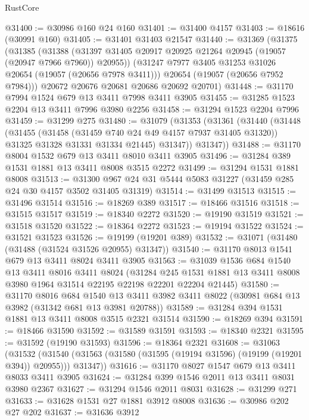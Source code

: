 \begin{lexlean}{RustCore}
\begin{coremodule}
@31400 := @30986 @160 @24 @160
@31401 := @31400 @4157
@31403 := @18616 (@30991 @160)
@31405 := @31401 @31403 @21547
@31440 := @31369
    (@31375
      (@31385
        (@31388 (@31397 @31405 @20917 @20925 @21264 @20945 (@19057 (@20947 @7966 @7960)) @20955))
        (@31247 @7977 @3405 @31253 @31026 @20654 (@19057 (@20656 @7978 @3411)))
        @20654
        (@19057 (@20656 @7952 @7984)))
      @20672
      @20676
      @20681
      @20686
      @20692
      @20701)
@31448 := @31170 @7994 @1524 @679 @13 @3411 @7998 @3411 @3905
@31455 := @31285 @1523 @2204 @13 @3411 @7996 @3980 @2256
@31458 := @31294 @1523 @2204 @7996
@31459 := @31299 @275
@31480 := @31079
    (@31353
      (@31361
        (@31440
          (@31448
            (@31455
              (@31458 (@31459 @740 @24 @49 @4157 @7937 @31405 @31320))
              @31325
              @31328
              @31331
              @31334
              @21445)
            @31347))
        @31347))
@31488 := @31170 @8004 @1532 @679 @13 @3411 @8010 @3411 @3905
@31496 := @31284 @389 @1531 @1881 @13 @3411 @8008 @3515 @2272
@31499 := @31294 @1531 @1881 @8008
@31513 := @31300 @967 @24 @31 @5444 @5083 @31227 (@31459 @285 @24 @30 @4157 @3502 @31405 @31319)
@31514 := @31499 @31513
@31515 := @31496 @31514
@31516 := @18269 @389
@31517 := @18466 @31516
@31518 := @31515 @31517
@31519 := @18340 @2272
@31520 := @19190 @31519
@31521 := @31518 @31520
@31522 := @18364 @2272
@31523 := @19194 @31522
@31524 := @31521 @31523
@31526 := @19199 (@19201 @389)
@31532 := @31071 (@31480 (@31488 (@31524 @31526 @20955) @31347))
@31540 := @31170 @8013 @1541 @679 @13 @3411 @8024 @3411 @3905
@31563 := @31039
    @1536
    @684
    @1540
    @13
    @3411
    @8016
    @3411
    @8024
    (@31284 @245 @1531 @1881 @13 @3411 @8008 @3980 @1964 @31514 @22195 @22198 @22201 @22204 @21445)
@31580 := @31170
    @8016
    @684
    @1540
    @13
    @3411
    @3982
    @3411
    @8022
    (@30981 @684 @13 @3982 (@31342 @681 @13 @3981 @20788))
@31589 := @31284 @394 @1531 @1881 @13 @3411 @8008 @3515 @2321 @31514
@31590 := @18269 @394
@31591 := @18466 @31590
@31592 := @31589 @31591
@31593 := @18340 @2321
@31595 := @31592 (@19190 @31593)
@31596 := @18364 @2321
@31608 := @31063
    (@31532
      (@31540 (@31563 (@31580 (@31595 (@19194 @31596) (@19199 (@19201 @394)) @20955))) @31347))
@31616 := @31170 @8027 @1547 @679 @13 @3411 @8033 @3411 @3905
@31624 := @31284 @399 @1546 @2011 @13 @3411 @8031 @3980 @2367
@31627 := @31294 @1546 @2011 @8031
@31628 := @31299 @271
@31633 := @31628 @1531 @27 @1881 @3912 @8008
@31636 := @30986 @202 @27 @202
@31637 := @31636 @3912

\end{coremodule}
\end{lexlean}
